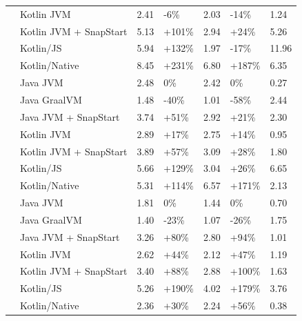 \begin{table}[!h]
\begin{tabular}{|>{\centering\arraybackslash}m{1.5cm}|l|p{1.5cm}|p{1.5cm}|p{1.5cm}|p{1.5cm}|p{1.5cm}|}
 & Kotlin JVM & 2.41 & \mbox{-6\%} & 2.03 & \mbox{-14\%} & 1.24 \\
 & Kotlin JVM + SnapStart & 5.13 & \mbox{+101\%} & 2.94 & \mbox{+24\%} & 5.26 \\
 & Kotlin/JS & 5.94 & \mbox{+132\%} & 1.97 & \mbox{-17\%} & 11.96 \\
 & Kotlin/Native & 8.45 & \mbox{+231\%} & 6.80 & \mbox{+187\%} & 6.35 \\
\midrule
\multirow{7}{*}{1024} & Java JVM & 2.48 & \mbox{0\%} & 2.42 & \mbox{0\%} & 0.27 \\
 & Java GraalVM & 1.48 & \mbox{-40\%} & 1.01 & \mbox{-58\%} & 2.44 \\
 & Java JVM + SnapStart & 3.74 & \mbox{+51\%} & 2.92 & \mbox{+21\%} & 2.30 \\
 & Kotlin JVM & 2.89 & \mbox{+17\%} & 2.75 & \mbox{+14\%} & 0.95 \\
 & Kotlin JVM + SnapStart & 3.89 & \mbox{+57\%} & 3.09 & \mbox{+28\%} & 1.80 \\
 & Kotlin/JS & 5.66 & \mbox{+129\%} & 3.04 & \mbox{+26\%} & 6.65 \\
 & Kotlin/Native & 5.31 & \mbox{+114\%} & 6.57 & \mbox{+171\%} & 2.13 \\
\midrule
\multirow{7}{*}{2048} & Java JVM & 1.81 & \mbox{0\%} & 1.44 & \mbox{0\%} & 0.70 \\
 & Java GraalVM & 1.40 & \mbox{-23\%} & 1.07 & \mbox{-26\%} & 1.75 \\
 & Java JVM + SnapStart & 3.26 & \mbox{+80\%} & 2.80 & \mbox{+94\%} & 1.01 \\
 & Kotlin JVM & 2.62 & \mbox{+44\%} & 2.12 & \mbox{+47\%} & 1.19 \\
 & Kotlin JVM + SnapStart & 3.40 & \mbox{+88\%} & 2.88 & \mbox{+100\%} & 1.63 \\
 & Kotlin/JS & 5.26 & \mbox{+190\%} & 4.02 & \mbox{+179\%} & 3.76 \\
 & Kotlin/Native & 2.36 & \mbox{+30\%} & 2.24 & \mbox{+56\%} & 0.38 \\
\bottomrule
\end{tabular}
\label{table:warm_start_comparison}
\end{table}

